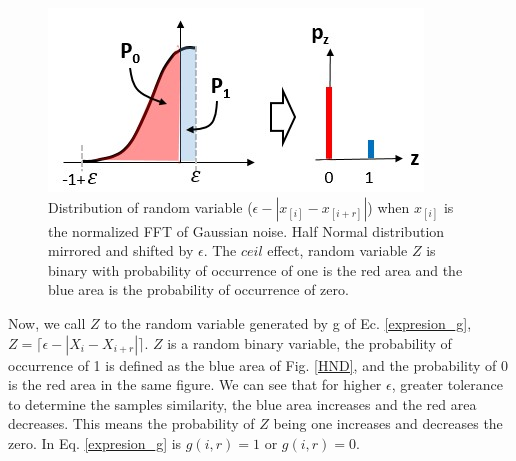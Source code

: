 \documentclass[lettersize,journal]{IEEEtran}
\begin{document}
\begin{figure}[htbp]
    \centerline{\includegraphics[width=0.7\columnwidth]{pdf.JPG}}
    \caption{Distribution of random variable ($\epsilon- |x_{[i]}-x_{[i+r]}|$) when $x_{[i]}$ is the normalized FFT of Gaussian noise. Half Normal distribution mirrored and shifted by $\epsilon$. The $ceil$ effect, random variable $Z$ is binary with probability of occurrence of one is the red area and the blue area is the probability of occurrence of zero. }
    \label{fig:HND}
\end{figure}
Now, we call $Z$ to the random variable generated by g of Ec. \ref{expresion_g}, $Z=\lceil \epsilon- | X_{i}-X_{i+r}| \rceil$. 
$Z$ is a random binary variable, the probability of occurrence of 1 is defined as the blue area of Fig. \ref{HND}, and the probability of 0 is the red area in the same figure. We can see that for higher $\epsilon$, greater tolerance to determine the samples similarity, the blue area increases and the red area decreases. This means the probability of $Z$ being one increases and decreases the zero. In Eq. \ref{expresion_g} is $g(i,r)=1$ or $g(i,r)=0$.

\end{document}
